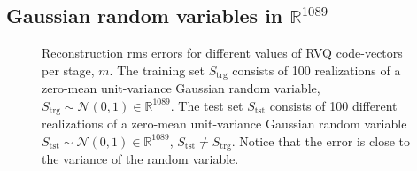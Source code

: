 \clearpage
\newpage
\subsection{Gaussian random variables in $\mathbb{R}^{1089}$}

								\begin{figure}[h]
								\centering
								\subtable{\begin{tiny}\end{tiny}}
								\caption{Reconstruction rms errors for different values of RVQ code-vectors per stage, $m$.  The training set $S_{\textrm{trg}}$ consists of 100 realizations of a zero-mean unit-variance Gaussian random variable, $S_{\textrm{trg}} \sim \mathcal{N}(0, 1) \in \mathbb{R}^{1089}$.  The test set $S_{\textrm{tst}}$ consists of 100 different realizations of a zero-mean unit-variance Gaussian random variable 	 $S_{\textrm{tst}} \sim \mathcal{N}(0, 1) \in \mathbb{R}^{1089}$, $S_{\textrm{tst}} \neq S_{\textrm{trg}}$.  Notice that the error is close to the variance of the random variable. }
								\label{fig:aRVQ_gaussian_rand}
								\end{figure}

\clearpage
\newpage
